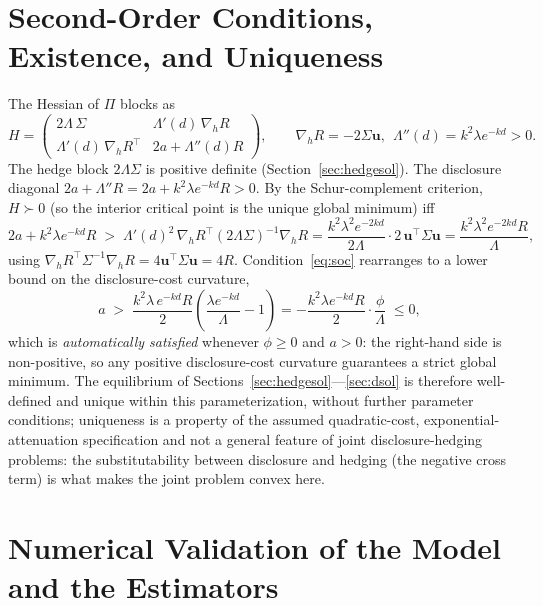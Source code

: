 \documentclass[11pt,a4paper]{article}
\begin{document}
\section{Second-Order Conditions, Existence, and Uniqueness}
\label{sec:soc}

The Hessian of $\Pi$ blocks as
\begin{equation}
H=\begin{pmatrix} 2\Lambda\,\Sigma & \Lambda'(d)\,\nabla_{h}R\\[2pt] \Lambda'(d)\,\nabla_{h}R^\top & 2a+\Lambda''(d)R\end{pmatrix},
\qquad \nabla_h R=-2\Sigma\mathbf u,\ \ \Lambda''(d)=k^2\lambda e^{-kd}>0.
\end{equation}
The hedge block $2\Lambda\Sigma$ is positive definite (Section~\ref{sec:hedgesol}). The disclosure diagonal $2a+\Lambda''R=2a+k^2\lambda e^{-kd}R>0$. By the Schur-complement criterion, $H\succ 0$ (so the interior critical point is the unique global minimum) iff
\begin{equation}
2a+k^2\lambda e^{-kd}R \;>\; \Lambda'(d)^2\,\nabla_h R^\top(2\Lambda\Sigma)^{-1}\nabla_h R
= \frac{k^2\lambda^2 e^{-2kd}}{2\Lambda}\cdot 2\,\mathbf u^\top\Sigma\mathbf u=\frac{k^2\lambda^2 e^{-2kd}R}{\Lambda},
\label{eq:soc}
\end{equation}
using $\nabla_h R^\top\Sigma^{-1}\nabla_h R=4\mathbf u^\top\Sigma\mathbf u=4R$. Condition~\eqref{eq:soc} rearranges to a lower bound on the disclosure-cost curvature,
\begin{equation}
a\;>\;\frac{k^2\lambda\,e^{-kd}R}{2}\left(\frac{\lambda e^{-kd}}{\Lambda}-1\right)=-\frac{k^2\lambda e^{-kd}R}{2}\cdot\frac{\phi}{\Lambda}\;\le 0,
\end{equation}
which is \emph{automatically satisfied} whenever $\phi\ge0$ and $a>0$: the right-hand side is non-positive, so any positive disclosure-cost curvature guarantees a strict global minimum. The equilibrium of Sections~\ref{sec:hedgesol}---\ref{sec:dsol} is therefore well-defined and unique within this parameterization, without further parameter conditions; uniqueness is a property of the assumed quadratic-cost, exponential-attenuation specification and not a general feature of joint disclosure-hedging problems: the substitutability between disclosure and hedging (the negative cross term) is what makes the joint problem convex here.


\section{Numerical Validation of the Model and the Estimators}
\label{sec:numerics}
\end{document}
